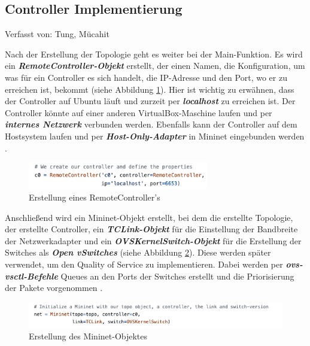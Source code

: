 \documentclass[fontsize=12pt,paper=a4,open=any,parskip=half,
  twoside=false,toc=listof,toc=bibliography,fleqn,leqno,
  captions=nooneline,captions=tableabove,british]{scrbook}
\begin{document}
\subsection{Controller Implementierung}
{\tiny Verfasst von: Tung, Mücahit\par}
Nach der Erstellung der Topologie geht es weiter bei der Main-Funktion. Es wird ein \textit{\textbf{RemoteController-Objekt}} erstellt, der einen Namen, die Konfiguration, um was für ein Controller es sich handelt, die IP-Adresse und den Port, wo er zu erreichen ist, bekommt (siehe Abbildung \ref{mininet5}). Hier ist wichtig zu erwähnen, dass der Controller auf Ubuntu läuft und zurzeit per \textit{\textbf{localhost}} zu erreichen ist. Der Controller könnte auf einer anderen VirtualBox-Maschine laufen und per \textit{\textbf{internes Netzwerk}} verbunden werden. Ebenfalls kann der Controller auf dem Hostsystem laufen und per \textit{\textbf{Host-Only-Adapter}} in Mininet eingebunden werden \cite{mnvm}. 

\begin{figure}[H]
 \centering
 \includegraphics[width=0.7\textwidth]{Bilder/mininet5}
 \captionsetup{justification=centering,margin=1cm}
 \caption{Erstellung eines RemoteController's}
 \label{mininet5}
\end{figure}

Anschließend wird ein Mininet-Objekt erstellt, bei dem die erstellte Topologie, der erstellte Controller, ein \textit{\textbf{TCLink-Objekt}} für die Einstellung der Bandbreite der Netzwerkadapter und ein \textit{\textbf{OVSKernelSwitch-Objekt}} für die Erstellung der Switches als \textit{\textbf{Open vSwitches}} (siehe Abbildung \ref{mininet6}). Diese werden später verwendet, um den Quality of Service zu implementieren. Dabei werden per \textit{\textbf{ovs-vsctl-Befehle}} Queues an den Ports der Switches erstellt und die Priorisierung der Pakete vorgenommen \cite{qosovs}.

\begin{figure}[H]
 \centering
 \includegraphics[width=1.0\textwidth]{Bilder/mininet6}
 \captionsetup{justification=centering,margin=1cm}
 \caption{Erstellung des Mininet-Objektes}
 \label{mininet6}
\end{figure}
\end{document}
